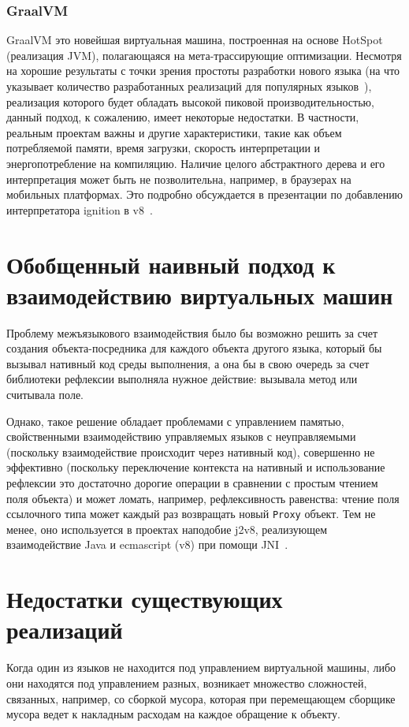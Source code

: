 \documentclass[times
]{itmo-student-thesis}
\begin{document}
\subsubsection{GraalVM}
GraalVM это новейшая виртуальная машина, построенная на основе HotSpot (реализация JVM), полагающаяся на мета-трассирующие оптимизации. Несмотря на хорошие результаты с точки зрения простоты разработки нового языка (на что указывает количество разработанных реализаций для популярных языков~\cite{graal-langs}), реализация которого будет обладать высокой пиковой производительностью, данный подход, к сожалению, имеет некоторые недостатки. В частности, реальным проектам важны и другие характеристики, такие как объем потребляемой памяти, время загрузки, скорость интерпретации и энергопотребление на компиляцию. Наличие целого абстрактного дерева и его интерпретация может быть не позволительна, например, в браузерах на мобильных платформах. Это подробно обсуждается в презентации по добавлению интерпретатора ignition в v8~\cite{ignition-iterpreter}.

\section{Обобщенный наивный подход к взаимодействию виртуальных машин}
Проблему межъязыкового взаимодействия было бы возможно решить за счет создания объекта-посредника для каждого объекта другого языка, который бы вызывал нативный код среды выполнения, а она бы в свою очередь за счет библиотеки рефлексии выполняла нужное действие: вызывала метод или считывала поле.

Однако, такое решение обладает проблемами с управлением памятью, свойственными взаимодействию управляемых языков с неуправляемыми (поскольку взаимодействие происходит через нативный код), совершенно не эффективно (поскольку переключение контекста на нативный и использование рефлексии это достаточно дорогие операции в сравнении с простым чтением поля объекта) и может ломать, например, рефлексивность равенства: чтение поля ссылочного типа может каждый раз возвращать новый \texttt{Proxy} объект. Тем не менее, оно используется в проектах наподобие j2v8, реализующем взаимодействие Java и ecmascript (v8) при помощи JNI~\cite{j2v8}.


\section{Недостатки существующих реализаций}
Когда один из языков не находится под управлением виртуальной машины, либо они находятся под управлением разных, возникает множество сложностей, связанных, например, со сборкой мусора, которая при перемещающем сборщике мусора ведет к накладным расходам на каждое обращение к объекту.
\end{document}
